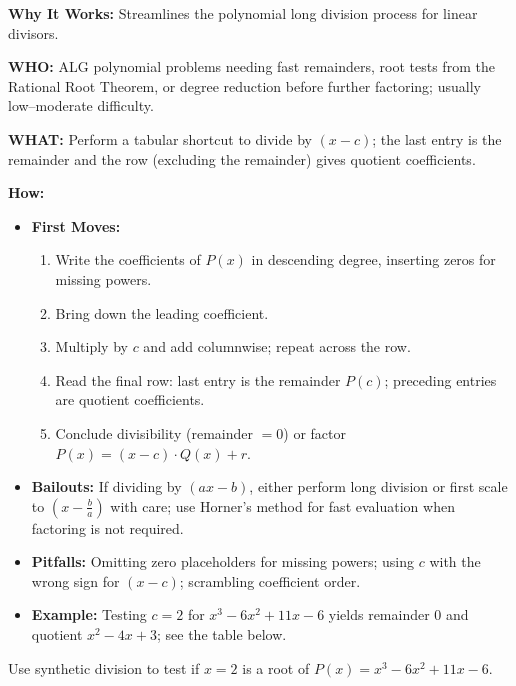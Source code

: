\documentclass[12pt]{article}
\newenvironment{problem}[1]
{\begin{tcolorbox}[colback=blue!5!white,colframe=blue!75!black,title={#1}]}{\end{tcolorbox}}
\begin{document}
\textbf{Why It Works:} Streamlines the polynomial long division process for linear divisors.

\textbf{WHO:} ALG polynomial problems needing fast remainders, root tests from the Rational Root Theorem, or degree reduction before further factoring; usually low–moderate difficulty.

\textbf{WHAT:} Perform a tabular shortcut to divide by $(x-c)$; the last entry is the remainder and the row (excluding the remainder) gives quotient coefficients.


\textbf{How:}
\begin{itemize}
    \item \textbf{First Moves:}
    \begin{enumerate}[nosep]
        \item Write the coefficients of $P(x)$ in descending degree, inserting zeros for missing powers.
        \item Bring down the leading coefficient.
        \item Multiply by $c$ and add columnwise; repeat across the row.
        \item Read the final row: last entry is the remainder $P(c)$; preceding entries are quotient coefficients.
        \item Conclude divisibility (remainder $=0$) or factor $P(x)=(x-c)\cdot Q(x)+r$.
    \end{enumerate}
    \item \textbf{Bailouts:} If dividing by $(ax-b)$, either perform long division or first scale to $(x-\tfrac{b}{a})$ with care; use Horner's method for fast evaluation when factoring is not required.
    \item \textbf{Pitfalls:} Omitting zero placeholders for missing powers; using $c$ with the wrong sign for $(x-c)$; scrambling coefficient order.
    \item \textbf{Example:} Testing $c=2$ for $x^3-6x^2+11x-6$ yields remainder $0$ and quotient $x^2-4x+3$; see the table below.
\end{itemize}

\begin{problem}{Example: Testing a Root}
Use synthetic division to test if $x = 2$ is a root of $P(x) = x^3 - 6x^2 + 11x - 6$.
\end{problem}
\end{document}
